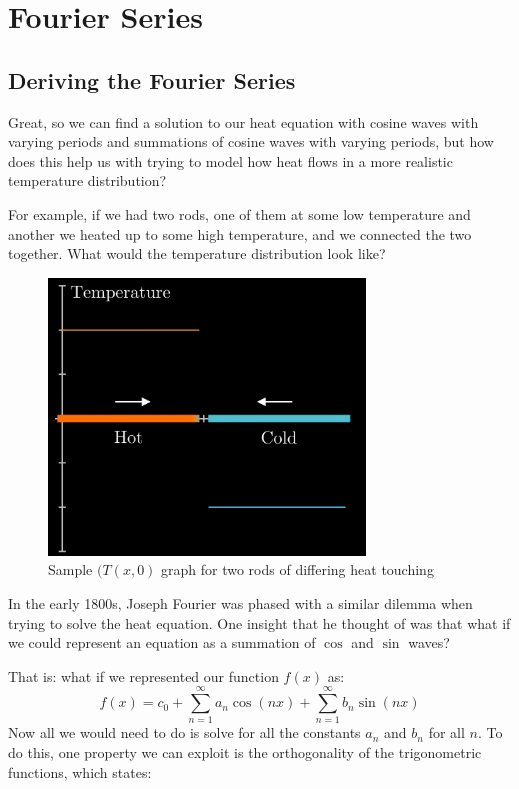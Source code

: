 \documentclass{report}
\begin{document}
\chapter{Fourier Series}
\section{Deriving the Fourier Series}

Great, so we can find a solution to our heat equation with cosine waves with varying periods 
and summations of cosine waves with varying periods, but how does this help us with trying to model 
how heat flows in a more realistic temperature distribution? 

For example, if we had two rods, one of them at some low temperature and another we heated up to some
high temperature, and we connected the two together. What would the temperature distribution look like? 

\begin{figure}[H]
    \label{two_rods_touching_figure}
    \centering
    \includegraphics[width=0.75\textwidth]{images/sample_two_rods_distribution.png}
    \caption{Sample $(T(x,0)$ graph for two rods of differing heat touching}
\end{figure}

In the early 1800s, Joseph Fourier was phased with a similar dilemma when trying to solve the heat equation.
One insight that he thought of was that what if we could represent an equation as a summation of $\cos$ and $\sin$ waves?

That is: what if we represented our function $f(x)$ as:
\[ f(x)= c_0 + \sum_{n=1}^{\infty} a_n\cos(nx) + \sum_{n=1}^{\infty} b_n\sin(nx) \]
Now all we would need to do is solve for all the constants $a_n$ and $b_n$ for all $n$. To do this, one property we can exploit is the orthogonality of the 
trigonometric functions, which states:
\end{document}
